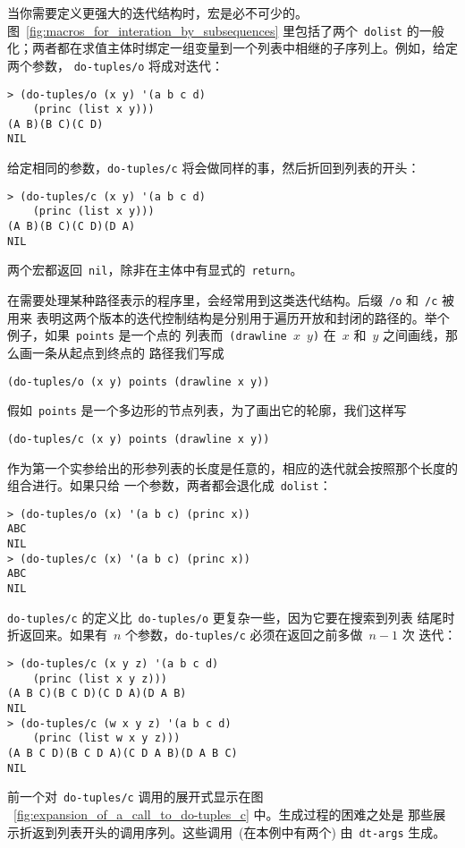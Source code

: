 当你需要定义更强大的迭代结构时，宏是必不可少的。
图~\ref{fig:macros_for_interation_by_subsequences} 里包括了两个~\texttt{dolist}
的一般化；两者都在求值主体时绑定一组变量到一个列表中相继的子序列上。例如，给定两个参数，
\texttt{do-tuples/o} 将成对迭代：
\begin{lstlisting}
> (do-tuples/o (x y) '(a b c d)
    (princ (list x y)))
(A B)(B C)(C D)
NIL
\end{lstlisting}
给定相同的参数，\verb|do-tuples/c| 将会做同样的事，然后折回到列表的开头：
\begin{lstlisting}
> (do-tuples/c (x y) '(a b c d)
    (princ (list x y)))
(A B)(B C)(C D)(D A)
NIL
\end{lstlisting}
两个宏都返回~\texttt{nil}，除非在主体中有显式的~\texttt{return}。

在需要处理某种路径表示的程序里，会经常用到这类迭代结构。后缀~\texttt{/o} 和~\texttt{/c} 被用来
表明这两个版本的迭代控制结构是分别用于遍历开放和封闭的路径的。举个例子，如果~\texttt{points} 是一个点的
列表而~\texttt{(drawline $x$ $y$)} 在~$x$ 和~$y$ 之间画线，那么画一条从起点到终点的
路径我们写成
\begin{lstlisting}
(do-tuples/o (x y) points (drawline x y))
\end{lstlisting}
假如~\texttt{points} 是一个多边形的节点列表，为了画出它的轮廓，我们这样写
\begin{lstlisting}
(do-tuples/c (x y) points (drawline x y))
\end{lstlisting}

作为第一个实参给出的形参列表的长度是任意的，相应的迭代就会按照那个长度的组合进行。如果只给
一个参数，两者都会退化成~\texttt{dolist}：
\begin{lstlisting}
> (do-tuples/o (x) '(a b c) (princ x))
ABC
NIL
> (do-tuples/c (x) '(a b c) (princ x))
ABC
NIL
\end{lstlisting}

\verb|do-tuples/c| 的定义比~\texttt{do-tuples/o} 更复杂一些，因为它要在搜索到列表
结尾时折返回来。如果有~$n$ 个参数，\texttt{do-tuples/c} 必须在返回之前多做~$n-1$ 次
迭代：
\begin{lstlisting}
> (do-tuples/c (x y z) '(a b c d)
    (princ (list x y z)))
(A B C)(B C D)(C D A)(D A B)
NIL
> (do-tuples/c (w x y z) '(a b c d)
    (princ (list w x y z)))
(A B C D)(B C D A)(C D A B)(D A B C)
NIL
\end{lstlisting}
前一个对~\texttt{do-tuples/c} 调用的展开式显示在图
~\ref{fig:expansion_of_a_call_to_do-tuples_c} 中。生成过程的困难之处是
那些展示折返到列表开头的调用序列。这些调用~(在本例中有两个) 由~\texttt{dt-args} 生成。


